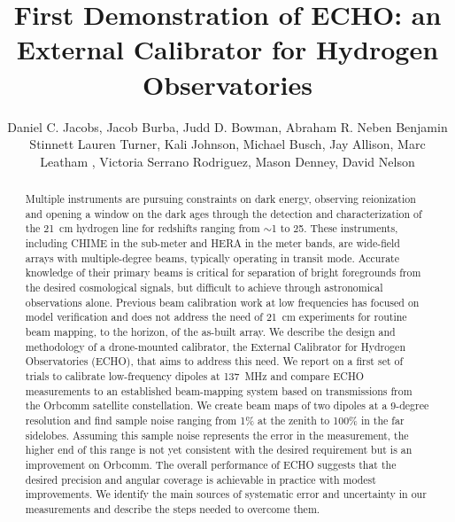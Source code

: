 \documentclass[preprint2,numberedappendix,tighten,twocolappendix]{aastex6}
\begin{document}
\title{First Demonstration of ECHO: an External Calibrator for Hydrogen Observatories}



\author{
Daniel C. Jacobs,
Jacob Burba,
Judd D. Bowman,
Abraham R. Neben
Benjamin Stinnett
Lauren Turner,
Kali Johnson,%
Michael Busch,%
Jay Allison,%
Marc Leatham ,%
Victoria Serrano Rodriguez,%
Mason Denney,%
David Nelson
}



\begin{abstract}
Multiple instruments are pursuing constraints on dark energy, observing reionization and opening a window on the dark ages through the detection and characterization of the 21~cm hydrogen line for redshifts ranging from $\sim$1 to 25.  These instruments, including CHIME in the sub-meter and HERA in the meter bands, are wide-field arrays with multiple-degree beams, typically operating in transit mode.  Accurate knowledge of their primary beams is critical for separation of bright foregrounds from the desired cosmological signals, but difficult to achieve through astronomical observations alone.  Previous beam calibration work at low frequencies has focused on model verification and does not address the need of 21~cm experiments for routine beam mapping, to the horizon, of the as-built array.  We describe the design and methodology of a drone-mounted calibrator, the External Calibrator for Hydrogen Observatories (ECHO), that aims to address this need. We report on a first set of trials to calibrate low-frequency dipoles at 137~MHz and compare ECHO measurements to an established beam-mapping system based on transmissions from the Orbcomm satellite constellation.  We create beam maps of two dipoles at a  9-degree resolution and find sample noise ranging from 1\% at the zenith to 100\% in the far sidelobes.  Assuming this sample noise represents the error in the measurement, the higher end of this range is not yet consistent with the desired requirement but is an improvement on Orbcomm.  The overall performance of ECHO suggests that the desired precision and angular coverage is achievable in practice with modest improvements. We identify the main sources of systematic error and uncertainty in our measurements and describe the steps needed to overcome them.
\end{abstract}
\end{document}
